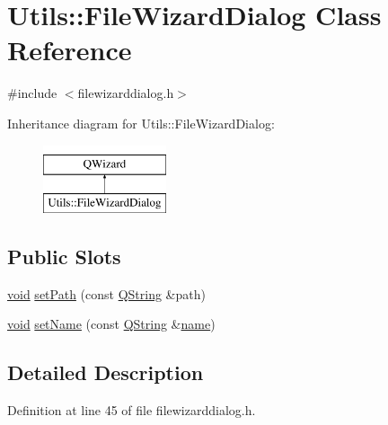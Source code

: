 \hypertarget{class_utils_1_1_file_wizard_dialog}{\section{Utils\-:\-:File\-Wizard\-Dialog Class Reference}
\label{class_utils_1_1_file_wizard_dialog}
}


{\ttfamily \#include $<$filewizarddialog.\-h$>$}

Inheritance diagram for Utils\-:\-:File\-Wizard\-Dialog\-:\begin{figure}[H]
\begin{center}
\leavevmode
\includegraphics[height=2.000000cm]{class_utils_1_1_file_wizard_dialog}
\end{center}
\end{figure}
\subsection*{Public Slots}
\begin{DoxyCompactItemize}
\item 
\hyperlink{group___u_a_v_objects_plugin_ga444cf2ff3f0ecbe028adce838d373f5c}{void} \hyperlink{class_utils_1_1_file_wizard_dialog_a2d304699b28391d97a69126a90cd9f01}{set\-Path} (const \hyperlink{group___u_a_v_objects_plugin_gab9d252f49c333c94a72f97ce3105a32d}{Q\-String} \&path)
\item 
\hyperlink{group___u_a_v_objects_plugin_ga444cf2ff3f0ecbe028adce838d373f5c}{void} \hyperlink{class_utils_1_1_file_wizard_dialog_a4d02b974e7547b44dc81a501d49195ec}{set\-Name} (const \hyperlink{group___u_a_v_objects_plugin_gab9d252f49c333c94a72f97ce3105a32d}{Q\-String} \&\hyperlink{glext_8h_ad977737dfc9a274a62741b9500c49a32}{name})
\end{DoxyCompactItemize}


\subsection{Detailed Description}


Definition at line 45 of file filewizarddialog.\-h.



